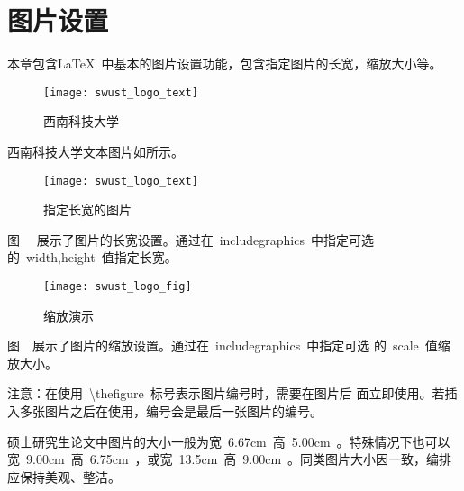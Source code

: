 \chapter{图片设置}

本章包含\LaTeX\ 中基本的图片设置功能，包含指定图片的长宽，缩放大小等。

\begin{figure}[ht]
  \centering
  \texttt{[image: swust\_logo\_text]}
  \caption{西南科技大学}
\end{figure}
西南科技大学文本图片如\thefigure 所示。

\begin{figure}[ht]
  \centering
  \texttt{[image: swust\_logo\_text]}
  \caption{指定长宽的图片}
\end{figure}
图~\thefigure~ 展示了图片的长宽设置。通过在~includegraphics~中指定可选
的~width,height~值指定长宽。

\begin{figure}[ht]
  \centering
  \texttt{[image: swust\_logo\_fig]}
  \caption{缩放演示}
\end{figure}

图~\thefigure~展示了图片的缩放设置。通过在~includegraphics~中指定可选
的~scale~值缩放大小。

注意：在使用~\textbackslash thefigure~标号表示图片编号时，需要在图片后
面立即使用。若插入多张图片之后在使用，编号会是最后一张图片的编号。

硕士研究生论文中图片的大小一般为宽~6.67cm~高~5.00cm~。特殊情况下也可以
宽~9.00cm~高~6.75cm~，或宽~13.5cm~高~9.00cm~。同类图片大小因一致，编排
应保持美观、整洁。
